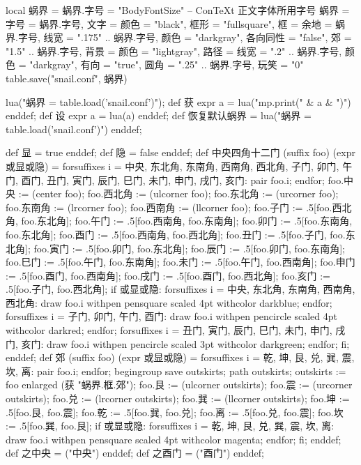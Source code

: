 \startluacode
local 蜗界 = {}
蜗界.字号 = "BodyFontSize" -- ConTeXt 正文字体所用字号
蜗界 = {
    字号 = 蜗界.字号,
    文字 = {颜色 = "black"},
    框形 = "fullsquare",
    框 = {余地 = 蜗界.字号, 
          线宽 = ".175" .. 蜗界.字号, 
          颜色 = "darkgray",
          各向同性 = "false",
          郊 = "1.5" .. 蜗界.字号},
    背景 = {颜色 = "lightgray"},
    路径 = {线宽 = ".2" .. 蜗界.字号,
            颜色 = "darkgray",
            有向 = "true",
            圆角 = ".25" .. 蜗界.字号},
    玩笑 = "0"
}
table.save("snail.conf", 蜗界)
\stopluacode

\startMPinclusions
lua("蜗界 = table.load('snail.conf')");
def 获 expr a = lua("mp.print(" & a & ")") enddef;
def 设 expr a = lua(a) enddef;
def 恢复默认蜗界 =
  lua("蜗界 = table.load('snail.conf')")
enddef;
\stopMPinclusions

\startMPinclusions[+]
def 显 = true enddef;
def 隐 = false enddef;
def 中央四角十二门 (suffix foo) (expr 或显或隐) = 
  forsuffixes i = 中央, 东北角, 东南角, 西南角, 西北角,
                  子门, 卯门, 午门, 酉门,
                  丑门, 寅门, 辰门, 巳门, 未门, 申门, 戌门, 亥门:
    pair foo.i;
  endfor;
  foo.中央 := (center foo);
  foo.西北角 := (ulcorner foo); 
  foo.东北角 := (urcorner foo);
  foo.东南角 := (lrcorner foo);
  foo.西南角 := (llcorner foo);
  foo.子门 := .5[foo.西北角, foo.东北角];
  foo.午门 := .5[foo.西南角, foo.东南角];
  foo.卯门 := .5[foo.东南角, foo.东北角];
  foo.酉门 := .5[foo.西南角, foo.西北角];
  foo.丑门 := .5[foo.子门, foo.东北角];
  foo.寅门 := .5[foo.卯门, foo.东北角];
  foo.辰门 := .5[foo.卯门, foo.东南角];
  foo.巳门 := .5[foo.午门, foo.东南角];
  foo.未门 := .5[foo.午门, foo.西南角];
  foo.申门 := .5[foo.酉门, foo.西南角];
  foo.戌门 := .5[foo.酉门, foo.西北角];
  foo.亥门 := .5[foo.子门, foo.西北角];
  if 或显或隐:
    forsuffixes i = 中央, 东北角, 东南角, 西南角, 西北角:
      draw foo.i withpen pensquare scaled 4pt withcolor darkblue;
    endfor;
    forsuffixes i = 子门, 卯门, 午门, 酉门:
      draw foo.i withpen pencircle scaled 4pt withcolor darkred;
    endfor;
    forsuffixes i = 丑门, 寅门, 辰门, 巳门, 未门, 申门, 戌门, 亥门:
      draw foo.i
        withpen pencircle scaled 3pt withcolor darkgreen;
    endfor;
  fi;
enddef;
def 郊 (suffix foo) (expr 或显或隐) = 
  forsuffixes i = 乾, 坤, 艮, 兑, 巽, 震, 坎, 离:
    pair foo.i;
  endfor;
  begingroup
    save outskirts; path outskirts;
  outskirts := foo enlarged (获 "蜗界.框.郊");
  foo.艮 := (ulcorner outskirts); 
  foo.震 := (urcorner outskirts);
  foo.兑 := (lrcorner outskirts);
  foo.巽 := (llcorner outskirts);
  foo.坤 := .5[foo.艮, foo.震];
  foo.乾 := .5[foo.巽, foo.兑];
  foo.离 := .5[foo.兑, foo.震];
  foo.坎 := .5[foo.巽, foo.艮];
  if 或显或隐:
    forsuffixes i = 乾, 坤, 艮, 兑, 巽, 震, 坎, 离:
      draw foo.i withpen pensquare scaled 4pt withcolor magenta;
    endfor;
  fi;
enddef;
def 之中央 = ("中央") enddef;
def 之酉门 = ("酉门") enddef;
\stopMPinclusions

